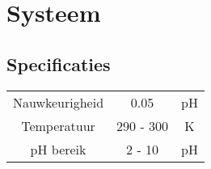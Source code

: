 \section{Systeem}

\subsection{Specificaties}
\begin{table}[ht]
    \begin{tabular}{|c|c|c|}
        Nauwkeurigheid & 0.05 & pH \\ 
        Temperatuur    & 290 - 300 & K \\
        pH bereik      & 2 - 10 & pH
    \end{tabular}
\end{table}
